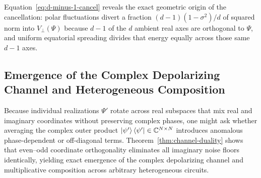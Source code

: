 Equation~\eqref{eq:d-minus-1-cancel} reveals the exact geometric origin of the cancellation: polar fluctuations divert a fraction $(d - 1)(1 - \sigma^2)/d$ of squared norm into $V_\perp(\Psi)$ because $d - 1$ of the $d$ ambient real axes are orthogonal to $\Psi$, and uniform equatorial spreading divides that energy equally across those same $d - 1$ axes.

\subsection{Emergence of the Complex Depolarizing Channel and Heterogeneous Composition}
\label{sec:channel-emergence}

Because individual realizations $\Psi'$ rotate across real subspaces that mix real and imaginary coordinates without preserving complex phases, one might ask whether averaging the complex outer product $\ket{\psi'}\bra{\psi'} \in \mathbb{C}^{N \times N}$ introduces anomalous phase-dependent or off-diagonal terms. Theorem~\ref{thm:channel-duality} shows that even--odd coordinate orthogonality eliminates all imaginary noise floors identically, yielding exact emergence of the complex depolarizing channel and multiplicative composition across arbitrary heterogeneous circuits.

